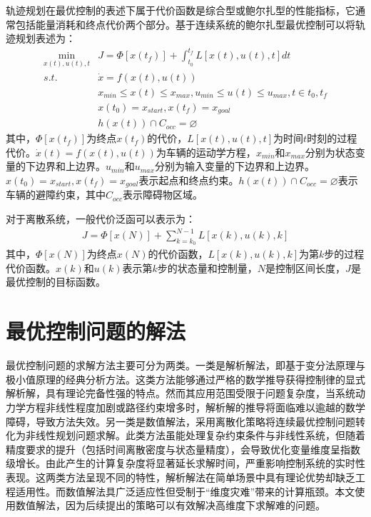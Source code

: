 \documentclass[master,academic]{ysuthesis} %
\begin{document}
	轨迹规划在最优控制的表述下属于代价函数是综合型或鲍尔扎型的性能指标，它通常包括能量消耗和终点代价两个部分。基于连续系统的鲍尔扎型最优控制可以将轨迹规划表述为：
	\begin{equation}
		\begin{aligned}
			\min_{x(t),u(t),t} &J = \Phi[x(t_f)]+\int_{t_0}^{t_f}L[x(t),u(t),t]dt\\
			s.t. \ \ \ &\dot{x} = f(x(t),u(t))\\
			&x_{min}\le x(t) \le x_{max},u_{min}\le u(t) \le u_{max},t \in{t_0,t_f}\\
			&x(t_0)=x_{start},x(t_f)=x_{goal}\\
			&h(x(t))\cap C_{occ}=\varnothing 
		\end{aligned}
	\end{equation}
	其中，$\Phi[x(t_f)]$为终点$x(t_f)$的代价，$L[x(t),u(t),t]$为时间$t$时刻的过程代价。$\dot{x}(t)=f(x(t),u(t))$为车辆的运动学方程，$x_{min}$和$x_{max}$分别为状态变量的下边界和上边界。$u_{min}$和$u_{max}$分别为输入变量的下边界和上边界。$x(t_0)=x_{start},x(t_f)=x_{goal}$表示起点和终点约束。$h(x(t))\cap C_{occ}=\varnothing$表示车辆的避障约束，其中$C_{occ}$表示障碍物区域。
	
	对于离散系统，一般代价泛函可以表示为：
	\begin{equation}
		\begin{aligned}
			J = \Phi[x(N)]+\sum_{k=k_0}^{N-1}L[x(k),u(k),k]
		\end{aligned}
	\end{equation}
	其中，$\Phi[x(N)]$为终点$x(N)$的代价函数，$L[x(k),u(k),k]$为第$k$步的过程代价函数。$x(k)$和$u(k)$表示第$k$步的状态量和控制量，$N$是控制区间长度，$J$是最优控制的目标函数。

	\section{最优控制问题的解法}
	最优控制问题的求解方法主要可分为两类。一类是解析解法，即基于变分法原理与极小值原理的经典分析方法。这类方法能够通过严格的数学推导获得控制律的显式解析解，具有理论完备性强的特点。然而其应用范围受限于问题复杂度，当系统动力学方程非线性程度加剧或路径约束增多时，解析解的推导将面临难以逾越的数学障碍，导致方法失效。另一类是数值解法，采用离散化策略将连续最优控制问题转化为非线性规划问题求解。此类方法虽能处理复杂约束条件与非线性系统，但随着精度要求的提升（包括时间离散密度与状态量精度），会导致优化变量维度呈指数级增长。由此产生的计算复杂度将显著延长求解时间，严重影响控制系统的实时性表现。这两类方法呈现不同的特性，解析解法在简单场景中具有理论优势却缺乏工程适用性。而数值解法具广泛适应性但受制于“维度灾难”带来的计算瓶颈。本文使用数值解法，因为后续提出的策略可以有效解决高维度下求解难的问题。
\end{document}
